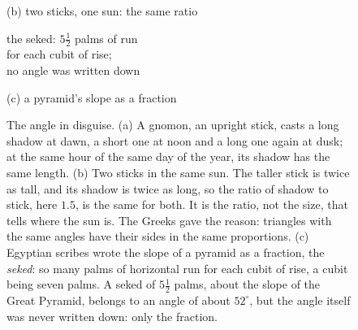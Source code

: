 \begin{figure}[tbp]
\begin{minipage}[b]{0.53\textwidth}
\smallskip
{\small (b) two sticks, one sun: the same ratio\par}
\end{minipage}\hfill
\begin{minipage}[b]{0.44\textwidth}
\centering
{}

\smallskip
{\footnotesize the seked: $5\tfrac{1}{2}$ palms of run\\ for each cubit of rise;\\ no angle was written down\par}

\smallskip
{\small (c) a pyramid's slope as a fraction\par}
\end{minipage}

\caption[The angle in disguise]{The angle in disguise. (a) A gnomon, an upright stick, casts a long shadow at dawn, a short one at noon and a long one again at dusk; at the same hour of the same day of the year, its shadow has the same length. (b) Two sticks in the same sun. The taller stick is twice as tall, and its shadow is twice as long, so the ratio of shadow to stick, here $1.5$, is the same for both. It is the ratio, not the size, that tells where the sun is. The Greeks gave the reason: triangles with the same angles have their sides in the same proportions. (c) Egyptian scribes wrote the slope of a pyramid as a fraction, the \emph{seked}: so many palms of horizontal run for each cubit of rise, a cubit being seven palms. A seked of $5\frac{1}{2}$ palms, about the slope of the Great Pyramid, belongs to an angle of about $52^\circ$, but the angle itself was never written down: only the fraction.}
\label{fig:gnomon}
\end{figure}

